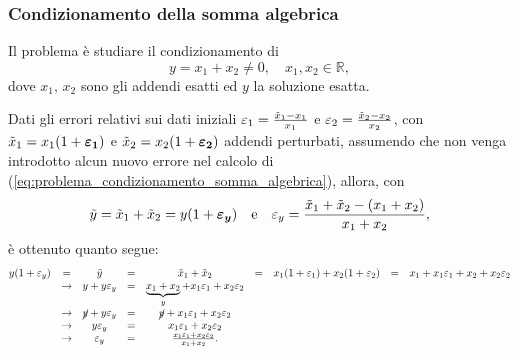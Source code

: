 \subsubsection{Condizionamento della somma algebrica}\label{sssec:condizionamento_somma_algebrica}
Il problema è studiare il condizionamento di
\begin{equation}\label{eq:problema_condizionamento_somma_algebrica}
	y=x_1+x_2\neq 0,\quad x_1,x_2\in\mathbb R,
\end{equation}
dove $x_1,\, x_2$ sono gli addendi esatti ed $y$ la soluzione esatta.

Dati gli errori relativi sui dati iniziali $\varepsilon_1=\frac{\Tilde{x}_1-x_1}{x_1}$ e $\varepsilon_2=\frac{\Tilde{x}_2-x_2}{x_2}$, con $\Tilde{x}_1=x_1(1+\boldsymbol{\varepsilon_1})$ e $\Tilde{x}_2=x_2(1+\boldsymbol{\varepsilon_2})$ addendi perturbati, assumendo che non venga introdotto alcun nuovo errore nel calcolo di (\ref{eq:problema_condizionamento_somma_algebrica}), allora, con
\begin{equation*}
	\Tilde{y}=\Tilde{x}_1+\Tilde{x}_2=y(1+\boldsymbol{\varepsilon_y})\quad\text{e}\quad\varepsilon_y=\frac{\Tilde{x}_1+\Tilde{x}_2-(x_1+x_2)}{x_1+x_2},
\end{equation*}
è ottenuto quanto segue:
\begin{equation*}
	\begin{matrix}
		y(1+\varepsilon_y)&=&\Tilde{y}&=&\Tilde{x}_1+\Tilde{x}_2&=&x_1(1+\varepsilon_1)+x_2(1+\varepsilon_2)&=&x_1+x_1\varepsilon_1+x_2+x_2\varepsilon_2\\
		&\rightarrow& y+y\varepsilon_y&=&\underbrace{x_1+x_2}_{y}+x_1\varepsilon_1+x_2\varepsilon_2\\
		&\rightarrow& \cancel{y}+y\varepsilon_y &=& \cancel{y}+x_1\varepsilon_1+x_2\varepsilon_2\\
		&\rightarrow& y\varepsilon_y &=& x_1\varepsilon_1+x_2\varepsilon_2 \\
		&\rightarrow& \varepsilon_y &=& \frac{x_1\varepsilon_1+x_2\varepsilon_2}{x_1+x_2}.
	\end{matrix}
\end{equation*}

